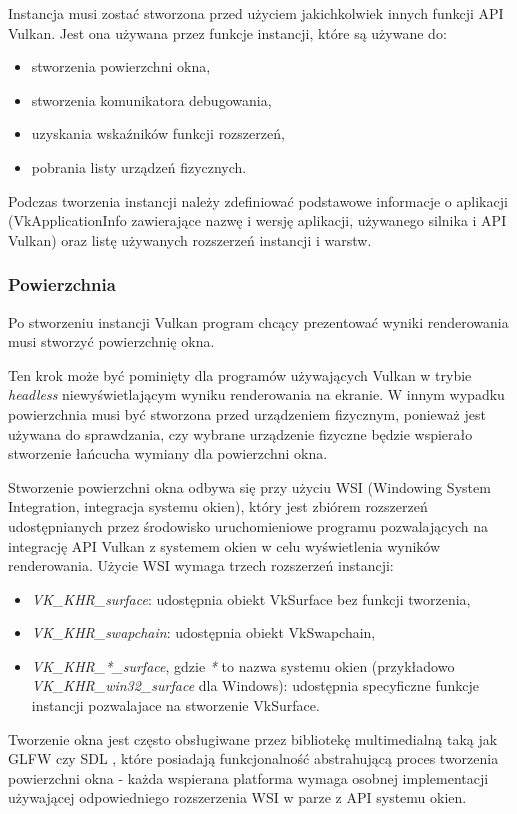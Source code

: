 Instancja musi zostać stworzona przed użyciem jakichkolwiek innych funkcji API Vulkan.
Jest ona używana przez funkcje instancji, które są używane do:
\begin{itemize}
	\item stworzenia powierzchni okna,
	\item stworzenia komunikatora debugowania,
	\item uzyskania wskaźników funkcji rozszerzeń,
	\item pobrania listy urządzeń fizycznych.
\end{itemize}

Podczas tworzenia instancji należy zdefiniować podstawowe informacje o aplikacji (VkApplicationInfo zawierające nazwę i wersję aplikacji, używanego silnika i API Vulkan) oraz listę używanych rozszerzeń instancji i warstw.

\subsubsection{Powierzchnia}

Po stworzeniu instancji Vulkan program chcący prezentować wyniki renderowania musi stworzyć powierzchnię okna.

Ten krok może być pominięty dla programów używających Vulkan w trybie \textit{headless} niewyświetlającym
wyniku renderowania na ekranie. W innym wypadku powierzchnia musi być stworzona przed urządzeniem fizycznym, ponieważ
jest używana do sprawdzania, czy wybrane urządzenie fizyczne będzie wspierało stworzenie łańcucha wymiany dla powierzchni okna.

Stworzenie powierzchni okna odbywa się przy użyciu WSI (Windowing System Integration, integracja systemu okien), który jest zbiórem rozszerzeń udostępnianych przez środowisko uruchomieniowe programu pozwalających na integrację API Vulkan z systemem okien w celu wyświetlenia wyników renderowania.
Użycie WSI wymaga trzech rozszerzeń instancji:
\begin{itemize}
	\item \textit{VK\_KHR\_surface}: udostępnia obiekt VkSurface bez funkcji tworzenia,
	\item \textit{VK\_KHR\_swapchain}: udostępnia obiekt VkSwapchain,
	\item \textit{VK\_KHR\_*\_surface}, gdzie \textit{*} to nazwa systemu okien (przykładowo \textit{VK\_KHR\_win32\_surface} dla Windows): udostępnia specyficzne funkcje instancji pozwalajace na stworzenie VkSurface.
\end{itemize}
Tworzenie okna jest często obsługiwane przez bibliotekę multimedialną taką jak GLFW \cite{GLFW} czy SDL \cite{SDL}, które posiadają funkcjonalność abstrahującą proces tworzenia powierzchni okna - każda wspierana platforma wymaga osobnej implementacji używającej odpowiedniego rozszerzenia WSI w parze z API systemu okien.

